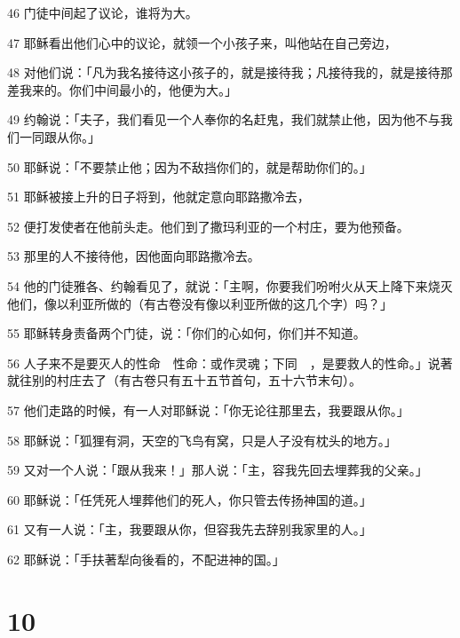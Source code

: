 \par 46 门徒中间起了议论，谁将为大。
\par 47 耶稣看出他们心中的议论，就领一个小孩子来，叫他站在自己旁边，
\par 48 对他们说：「凡为我名接待这小孩子的，就是接待我；凡接待我的，就是接待那差我来的。你们中间最小的，他便为大。」
\par 49 约翰说：「夫子，我们看见一个人奉你的名赶鬼，我们就禁止他，因为他不与我们一同跟从你。」
\par 50 耶稣说：「不要禁止他；因为不敌挡你们的，就是帮助你们的。」
\par 51 耶稣被接上升的日子将到，他就定意向耶路撒冷去，
\par 52 便打发使者在他前头走。他们到了撒玛利亚的一个村庄，要为他预备。
\par 53 那里的人不接待他，因他面向耶路撒冷去。
\par 54 他的门徒雅各、约翰看见了，就说：「主啊，你要我们吩咐火从天上降下来烧灭他们，像以利亚所做的（有古卷没有像以利亚所做的这几个字）吗？」
\par 55 耶稣转身责备两个门徒，说：「你们的心如何，你们并不知道。
\par 56 人子来不是要灭人的性命　性命：或作灵魂；下同　，是要救人的性命。」说著就往别的村庄去了（有古卷只有五十五节首句，五十六节末句）。
\par 57 他们走路的时候，有一人对耶稣说：「你无论往那里去，我要跟从你。」
\par 58 耶稣说：「狐狸有洞，天空的飞鸟有窝，只是人子没有枕头的地方。」
\par 59 又对一个人说：「跟从我来！」那人说：「主，容我先回去埋葬我的父亲。」
\par 60 耶稣说：「任凭死人埋葬他们的死人，你只管去传扬神国的道。」
\par 61 又有一人说：「主，我要跟从你，但容我先去辞别我家里的人。」
\par 62 耶稣说：「手扶著犁向後看的，不配进神的国。」

\chapter{10}

